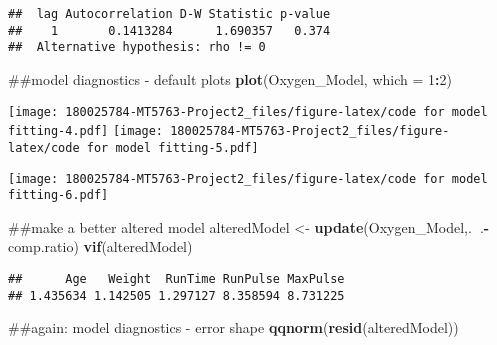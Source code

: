 \documentclass[]{article}
\newenvironment{Shaded}{\begin{snugshade}}{\end{snugshade}}
\newcommand{\KeywordTok}[1]{\textcolor[rgb]{0.13,0.29,0.53}{\textbf{#1}}}
\newcommand{\DataTypeTok}[1]{\textcolor[rgb]{0.13,0.29,0.53}{#1}}
\newcommand{\DecValTok}[1]{\textcolor[rgb]{0.00,0.00,0.81}{#1}}
\newcommand{\StringTok}[1]{\textcolor[rgb]{0.31,0.60,0.02}{#1}}
\newcommand{\OperatorTok}[1]{\textcolor[rgb]{0.81,0.36,0.00}{\textbf{#1}}}
\newcommand{\NormalTok}[1]{#1}
\begin{document}
\begin{verbatim}
##  lag Autocorrelation D-W Statistic p-value
##    1       0.1413284      1.690357   0.374
##  Alternative hypothesis: rho != 0
\end{verbatim}

\begin{Shaded}
\begin{Highlighting}[]
\NormalTok{##model diagnostics - default plots}
\KeywordTok{plot}\NormalTok{(Oxygen_Model, }\DataTypeTok{which =} \DecValTok{1}\OperatorTok{:}\DecValTok{2}\NormalTok{)}
\end{Highlighting}
\end{Shaded}

\texttt{[image: 180025784-MT5763-Project2\_files/figure-latex/code for model fitting-4.pdf]}
\texttt{[image: 180025784-MT5763-Project2\_files/figure-latex/code for model fitting-5.pdf]}

\begin{Shaded}
\end{Shaded}

\texttt{[image: 180025784-MT5763-Project2\_files/figure-latex/code for model fitting-6.pdf]}

\begin{Shaded}
\begin{Highlighting}[]
\NormalTok{##make a better altered model}
\NormalTok{alteredModel <-}\StringTok{ }\KeywordTok{update}\NormalTok{(Oxygen_Model,.}\OperatorTok{~}\NormalTok{.}\OperatorTok{-}\NormalTok{comp.ratio)}
\KeywordTok{vif}\NormalTok{(alteredModel)}
\end{Highlighting}
\end{Shaded}

\begin{verbatim}
##      Age   Weight  RunTime RunPulse MaxPulse 
## 1.435634 1.142505 1.297127 8.358594 8.731225
\end{verbatim}

\begin{Shaded}
\begin{Highlighting}[]
\NormalTok{##again: model diagnostics - error shape}
\KeywordTok{qqnorm}\NormalTok{(}\KeywordTok{resid}\NormalTok{(alteredModel))}
\end{Highlighting}
\end{Shaded}
\end{document}
